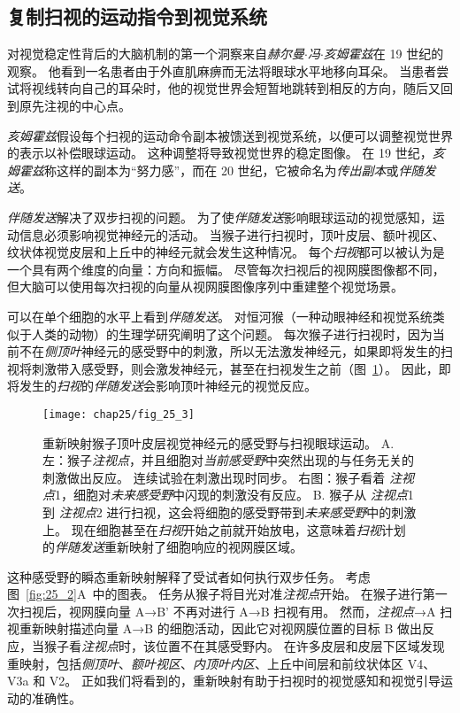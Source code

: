 \subsection{复制扫视的运动指令到视觉系统}

对视觉稳定性背后的大脑机制的第一个洞察来自\textit{赫尔曼$\cdot$冯$\cdot$亥姆霍兹}在 19 世纪的观察。
他看到一名患者由于外直肌麻痹而无法将眼球水平地移向耳朵。
当患者尝试将视线转向自己的耳朵时，他的视觉世界会短暂地跳转到相反的方向，随后又回到原先注视的中心点。


\textit{亥姆霍兹}假设每个扫视的运动命令副本被馈送到视觉系统，以便可以调整视觉世界的表示以补偿眼球运动。
这种调整将导致视觉世界的稳定图像。
在 19 世纪，\textit{亥姆霍兹}称这样的副本为“努力感”，而在 20 世纪，它被命名为\textit{传出副本}或\textit{伴随发送}。


\textit{伴随发送}解决了双步扫视的问题。
为了使\textit{伴随发送}影响眼球运动的视觉感知，运动信息必须影响视觉神经元的活动。
当猴子进行扫视时，顶叶皮层、额叶视区、纹状体视觉皮层和上丘中的神经元就会发生这种情况。
每个\textit{扫视}都可以被认为是一个具有两个维度的向量：方向和振幅。
尽管每次扫视后的视网膜图像都不同，但大脑可以使用每次扫视的向量从视网膜图像序列中重建整个视觉场景。


可以在单个细胞的水平上看到\textit{伴随发送}。
对恒河猴（一种动眼神经和视觉系统类似于人类的动物）的生理学研究阐明了这个问题。
每次猴子进行扫视时，因为当前不在\textit{侧顶叶}神经元的感受野中的刺激，所以无法激发神经元，如果即将发生的扫视将刺激带入感受野，则会激发神经元，甚至在扫视发生之前（图~\ref{fig:25_3}）。
因此，即将发生的\textit{扫视}的\textit{伴随发送}会影响顶叶神经元的视觉反应。


\begin{figure}[htbp]
	\centering
	\texttt{[image: chap25/fig\_25\_3]}
	\caption{重新映射猴子顶叶皮层视觉神经元的感受野与扫视眼球运动\cite{duhamel1992updating}。
		A. 左：猴子\textit{注视点}，并且细胞对\textit{当前感受野}中突然出现的与任务无关的刺激做出反应。
		连续试验在刺激出现时同步。
		右图：猴子看着 \textit{注视点}1，细胞对\textit{未来感受野}中闪现的刺激没有反应。
		B. 猴子从 \textit{注视点}1 到 \textit{注视点}2 进行扫视，这会将细胞的感受野带到\textit{未来感受野}中的刺激上。
		现在细胞甚至在\textit{扫视}开始之前就开始放电，这意味着\textit{扫视}计划的\textit{伴随发送}重新映射了细胞响应的视网膜区域。}
	\label{fig:25_3}
\end{figure}


这种感受野的瞬态重新映射解释了受试者如何执行双步任务。
考虑图~\ref{fig:25_2}A~中的图表。
任务从猴子将目光对准\textit{注视点}开始。
在猴子进行第一次扫视后，视网膜向量 A→B' 不再对进行 A→B 扫视有用。
然而，\textit{注视点}→A 扫视重新映射描述向量 A→B 的细胞活动，因此它对视网膜位置的目标 B 做出反应，当猴子看\textit{注视点}时，该位置不在其感受野内。
在许多皮层和皮层下区域发现重映射，包括\textit{侧顶叶}、\textit{额叶视区}、\textit{内顶叶内区}、上丘中间层和前纹状体区 V4、V3a 和 V2。
正如我们将看到的，重新映射有助于扫视时的视觉感知和视觉引导运动的准确性。


